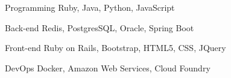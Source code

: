 
\begin{cvskills}

    \cvskill
    {Programming} %
    {Ruby, Java, Python, JavaScript} %

    \cvskill
    {Back-end} %
    {Redis, PostgresSQL, Oracle, Spring Boot} %

    \cvskill
    {Front-end} %
    {Ruby on Rails, Bootstrap, HTML5, CSS, JQuery} %

    \cvskill
    {DevOps} %
    {Docker, Amazon Web Services, Cloud Foundry} %

\end{cvskills}